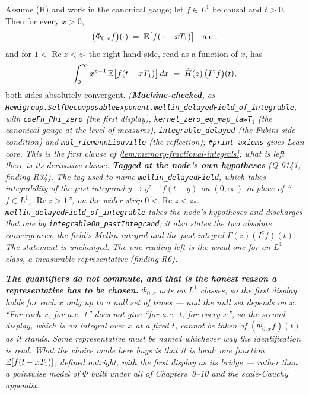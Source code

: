 \begin{lemma}\label{lem:delayed-average-mellin}
\leanok
Assume (H) and work in the canonical gauge; let $f \in L^1$ be causal and $t > 0$. Then for every
$x > 0$,
\[
  \bigl(\Phi_{0,x}f\bigr)(\cdot) \;=\; \mathbb{E}\bigl[f(\,\cdot - xT_1)\bigr] \quad\text{a.e.},
\]
and for $1 < \operatorname{Re} z < z_*$ the right-hand side, read as a function of $x$, has
\[
  \int_0^\infty x^{z-1}\,\mathbb{E}\bigl[f(t - xT_1)\bigr]\,dx \;=\; \tilde H(z)\,\bigl(I^z f\bigr)(t),
\]
both sides absolutely convergent.
\statusT\quad\emph{(\textbf{Machine-checked}, as
\texttt{Hemigroup.SelfDecomposableExponent.mellin\_delayedField\_of\_integrable}, with
\texttt{coeFn\_Phi\_zero} (the first display), \texttt{kernel\_zero\_eq\_map\_lawT}$_1$ (the
canonical gauge at the level of measures), \texttt{integrable\_delayed} (the Fubini side
condition) and \texttt{mul\_riemannLiouville} (the reflection);
\texttt{\#print axioms} gives Lean core. This is the first clause of
\ref{lem:memory-fractional-integrals}; what is left there is its derivative clause.
\textbf{Tagged at the node's own hypotheses} (Q-0141, finding R34). The tag used to name
\texttt{mellin\_delayedField}, which takes integrability of the past integrand
$y \mapsto y^{z-1}f(t-y)$ on $(0,\infty)$ in place of ``$f \in L^1$, $\operatorname{Re} z > 1$'',
on the wider strip $0 < \operatorname{Re} z < z_*$. \texttt{mellin\_delayedField\_of\_integrable}
takes the node's hypotheses and discharges that one by \texttt{integrableOn\_pastIntegrand}; it
also states the two absolute convergences, the field's Mellin integral and the past integral
$\Gamma(z)(I^zf)(t)$. The statement is unchanged. The one reading left is the usual one for an
$L^1$ class, a measurable representative (finding R6).}

\emph{\textbf{The quantifiers do not commute, and that is the honest reason a representative has to
be chosen.} $\Phi_{0,x}$ acts on $L^1$ classes, so the first display holds for each $x$ only up to
a null set of times --- and the null set depends on $x$. ``For each $x$, for a.e.\ $t$'' does not
give ``for a.e.\ $t$, for every $x$'', so the second display, which is an integral over $x$ at a
fixed $t$, cannot be taken of $(\Phi_{0,x}f)(t)$ as it stands. Some representative must be named
whichever way the identification is read. What the choice made here buys is that it is
\emph{local}: one function, $\mathbb{E}[f(t-xT_1)]$, defined outright, with the first display as its
bridge --- rather than a pointwise model of $\Phi$ built under all of Chapters~9--10 and the scale-Cauchy appendix.}


\end{lemma}
